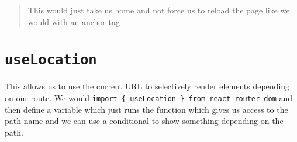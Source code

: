 \documentclass[
]{report}
\theoremstyle{definition}
\theoremstyle{definition}
\theoremstyle{definition}
\theoremstyle{definition}
\theoremstyle{remark}
\begin{document}
\begin{quote}
This would just take us home and not force us to reload the page like we
would with an anchor tag
\end{quote}

\hypertarget{uselocation}{%
\section{\texorpdfstring{\texttt{useLocation}}{useLocation}}\label{uselocation}}

This allows us to use the current URL to selectively render elements depending
on our route. We would \texttt{import\ \{\ useLocation\ \}\ from\ \textquotesingle{}react-router-dom\textquotesingle{}} and
then define a variable which just runs the function which gives us access to
the path name and we can use a conditional to show something depending on the
path.

  
\end{document}
